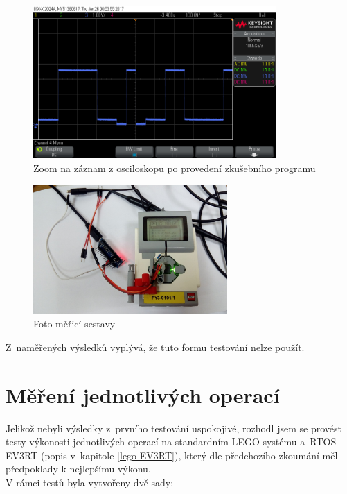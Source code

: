 \begin{figure}[h]
	\centering
	\includegraphics[width=350px]{images/measuring-oscilloscope_ev3-software_led-blinking_part1.png}
	\caption[Zoom na záznam z osciloskopu po provedení zkušebního programu]{Zoom na záznam z osciloskopu po provedení zkušebního programu}
	\label{fig:measuring_lego-ev3_orig-soft_led-blinking_part1}
\end{figure}

\begin{figure}[h]
	\centering
	\includegraphics[width=280px]{images/measuring-system_photo.jpg}
	\caption[Foto měřicí sestavy]{Foto měřicí sestavy}
	\label{fig:measuring-system_photo}
\end{figure}

Z~naměřených výsledků vyplývá, že tuto formu testování nelze použít.

\section{Měření jednotlivých operací}

Jelikož nebyli výsledky z~prvního testování uspokojivé, rozhodl jsem se provést testy výkonosti jednotlivých operací na standardním LEGO systému a~RTOS EV3RT (popis v~kapitole \ref{lego-EV3RT}), který dle předchozího zkoumání měl předpoklady k nejlepšímu výkonu.  \\

V rámci testů byla vytvořeny dvě sady: 

